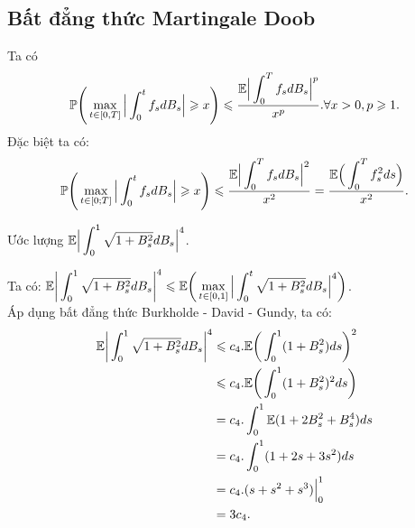 \subsection{Bất đẳng thức Martingale Doob} 
Ta có 
\[\mathbb{P}\Bigg(\displaystyle\max_{t\in[0,T]}\Big|\displaystyle \int_0^tf_sdB_s\Big| \geqslant x\Bigg) \leqslant \dfrac{\mathbb{E}\Big|\displaystyle \int_0^Tf_sdB_s\Big|^p}{x^p}. \forall x>0, p \geqslant 1.\]
Đặc biệt ta có: 
\[\mathbb{P}\Bigg(\displaystyle\max_{t\in[0;T]}\Big|\displaystyle \int_0^tf_sdB_s\Big| \geqslant x\Bigg) \leqslant \dfrac{\mathbb{E}\Big|\displaystyle \int_0^Tf_sdB_s\Big|^2}{x^2} = \dfrac{\mathbb{E}\Big(\displaystyle \int_0^Tf_s^2ds\Big)}{x^2}.\]
\begin{exam*}
Ước lượng $\mathbb{E}\Big|\displaystyle \int_0^1\sqrt{1+B_s^2}dB_s\Big|^4$.
\begin{sol*}
    Ta có: $\mathbb{E}\bigg|\displaystyle \int_0^1\sqrt{1+B_s^2}dB_s\bigg|^4 \leqslant \mathbb{E}\bigg(\displaystyle\max_{t\in[0,1]}\Big|\displaystyle \int_0^t\sqrt{1+B_s^2}dB_s\Big|^4\bigg)$.\\
    Áp dụng bất đẳng thức Burkholde - David - Gundy, ta có: 
    \begin{align*}
        \mathbb{E}\bigg|\displaystyle \int_0^1\sqrt{1+B_s^2}dB_s\bigg|^4 
        &\leqslant c_4.\mathbb{E}\bigg(\displaystyle \int_0^1(1+B_s^2)ds\bigg)^2\\
        &\leqslant c_4.\mathbb{E}\bigg(\displaystyle \int_0^1(1+B_s^2)^2ds\bigg)\\
        &= c_4.\displaystyle \int_0^1\mathbb{E}(1+2B_s^2+B_s^4)ds\\
        &= c_4.\displaystyle \int_0^1(1+2s+3s^2)ds\\
        &= c_4.(s+s^2+s^3)\Big|_0^1\\
        &= 3c_4.
    \end{align*}
\end{sol*}
\end{exam*}
